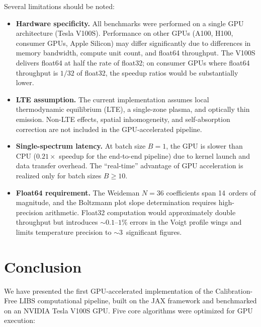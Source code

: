 \documentclass[preprint,12pt,authoryear]{elsarticle}
\begin{document}
Several limitations should be noted:
\begin{itemize}
  \item \textbf{Hardware specificity.} All benchmarks were performed on a single GPU architecture (Tesla V100S). Performance on other GPUs (A100, H100, consumer GPUs, Apple Silicon) may differ significantly due to differences in memory bandwidth, compute unit count, and float64 throughput. The V100S delivers float64 at half the rate of float32; on consumer GPUs where float64 throughput is $1/32$ of float32, the speedup ratios would be substantially lower.
  \item \textbf{LTE assumption.} The current implementation assumes local thermodynamic equilibrium (LTE), a single-zone plasma, and optically thin emission. Non-LTE effects, spatial inhomogeneity, and self-absorption correction are not included in the GPU-accelerated pipeline.
  \item \textbf{Single-spectrum latency.} At batch size $B = 1$, the GPU is slower than CPU ($0.21\times$ speedup for the end-to-end pipeline) due to kernel launch and data transfer overhead.
  The ``real-time'' advantage of GPU acceleration is realized only for batch sizes $B \geq 10$.
  \item \textbf{Float64 requirement.} The Weideman $N = 36$ coefficients span 14~orders of magnitude, and the Boltzmann plot slope determination requires high-precision arithmetic. Float32 computation would approximately double throughput but introduces $\sim 0.1$--$1\%$ errors in the Voigt profile wings and limits temperature precision to $\sim 3$~significant figures.
\end{itemize}

\section{Conclusion}
\label{sec:conclusion}

We have presented the first GPU-accelerated implementation of the Calibration-Free LIBS computational pipeline, built on the JAX framework and benchmarked on an NVIDIA Tesla V100S GPU.
Five core algorithms were optimized for GPU execution:
\end{document}
